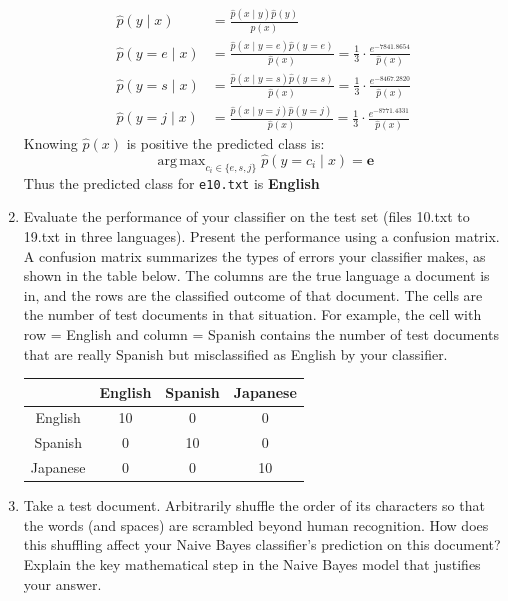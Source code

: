 \documentclass[a4paper]{article}
\theoremstyle{definition}
\DeclareMathOperator*{\argmax}{arg\,max}
\newenvironment{soln}{
    \leavevmode\color{blue}\ignorespaces
}{}
\begin{document}
\begin{enumerate}
\begin{soln}
    \begin{align*}
        \hat p(y \mid x) &= \frac{\hat p(x \mid y) \hat p(y)}{\hat p(x)} \\
        \hat p(y=e \mid x) &= \frac{\hat p(x \mid y=e) \hat p(y=e)}{\hat p(x)} = \frac{1}{3}\cdot\frac{e^{-7841.8654}}{\hat p(x)}\\
        \hat p(y=s \mid x) &= \frac{\hat p(x \mid y=s) \hat p(y=s)}{\hat p(x)} = \frac{1}{3}\cdot\frac{e^{-8467.2820}}{\hat p(x)}\\
        \hat p(y=j \mid x) &= \frac{\hat p(x \mid y=j) \hat p(y=j)}{\hat p(x)} = \frac{1}{3}\cdot\frac{e^{-8771.4331}}{\hat p(x)}
    \end{align*}
    Knowing $\hat p(x)$ is positive the predicted class is: 
    $$
    \argmax_{c_i\in\{e,s,j\}} \hat p(y=c_i \mid x) = \mathbf{e}
    $$
    Thus the predicted class for \texttt{e10.txt} is \textbf{English}
\end{soln}

\item
Evaluate the performance of your classifier on the test set (files 10.txt to 19.txt in three languages).
Present the performance using a confusion matrix. A confusion matrix summarizes the types of errors your classifier makes, as shown in the table below.   The columns are the true language a document is in, and the rows are the classified outcome of that document.  The cells are the number of test documents in that situation.  For example, the cell with row = English and column = Spanish contains the number of test documents that are really Spanish but misclassified as English by your classifier.
\begin{soln}
    \begin{center}
        \begin{tabular}{c|ccc}
            & English & Spanish & Japanese \\
            \hline
            English&10&0&0\\
            Spanish&0&10&0\\
            Japanese&0&0&10
        \end{tabular}
    \end{center}
\end{soln}


\item Take a test document.   Arbitrarily shuffle the order of its characters so that the words (and spaces) are scrambled beyond human recognition.  How does this shuffling affect your Naive Bayes classifier's prediction on this document?  Explain the key mathematical step in the Naive Bayes model that justifies your answer.


\end{enumerate}
\end{document}
